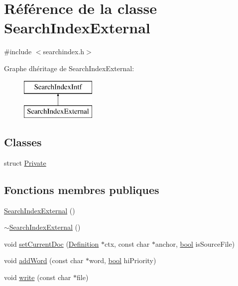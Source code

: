 \hypertarget{class_search_index_external}{}\section{Référence de la classe Search\+Index\+External}
\label{class_search_index_external}


{\ttfamily \#include $<$searchindex.\+h$>$}

Graphe d\textquotesingle{}héritage de Search\+Index\+External\+:\begin{figure}[H]
\begin{center}
\leavevmode
\includegraphics[height=2.000000cm]{class_search_index_external}
\end{center}
\end{figure}
\subsection*{Classes}
\begin{DoxyCompactItemize}
\item 
struct \hyperlink{struct_search_index_external_1_1_private}{Private}
\end{DoxyCompactItemize}
\subsection*{Fonctions membres publiques}
\begin{DoxyCompactItemize}
\item 
\hyperlink{class_search_index_external_abf03bebc7d6e6533841bd7caaf4f03ff}{Search\+Index\+External} ()
\item 
\hyperlink{class_search_index_external_acf1d122697c562ff75527fa4a8e05b08}{$\sim$\+Search\+Index\+External} ()
\item 
void \hyperlink{class_search_index_external_adcee9e316b56c1e9ae77c807f0b1db59}{set\+Current\+Doc} (\hyperlink{class_definition}{Definition} $\ast$ctx, const char $\ast$anchor, \hyperlink{qglobal_8h_a1062901a7428fdd9c7f180f5e01ea056}{bool} is\+Source\+File)
\item 
void \hyperlink{class_search_index_external_af54cf0b5fb981a1d36c32f8d47b4cfca}{add\+Word} (const char $\ast$word, \hyperlink{qglobal_8h_a1062901a7428fdd9c7f180f5e01ea056}{bool} hi\+Priority)
\item 
void \hyperlink{class_search_index_external_a6a3bf5db1a454bb12cac4e3253962206}{write} (const char $\ast$file)
\end{DoxyCompactItemize}
